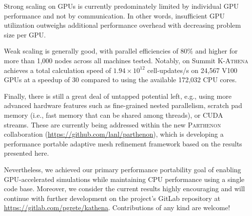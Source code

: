 \documentclass[10pt,journal,compsoc]{IEEEtran}
\newcommand{\textcode}[1]{\textsc{#1}}
\newcommand{\parthenon}{\textcode{Parthenon}\xspace}
\newcommand{\kathena}{\textcode{K-Athena}\xspace}
\newcommand{\cuda}{\textcode{CUDA}\xspace}
\begin{document}
Strong scaling on GPUs is currently predominately limited by individual GPU
performance and not by communication.
In other words, insufficient GPU utilization outweighs additional performance
overhead with decreasing problem size per GPU.

Weak scaling is generally good, with parallel efficiencies of $80\%$ and higher 
for more than 1,000 nodes across all machines tested.
Notably, on Summit \kathena achieves a total calculation speed of $1.94\times10^{12}$ cell-updates/s
on 24,567 V100 GPUs at a speedup of 30 compared to using the available 172,032 CPU cores.

Finally, there is still a great deal of untapped potential left, e.g., using
more advanced hardware features such as fine-grained nested parallelism, scratch pad 
memory (i.e., fast memory that can be shared among threads), or \cuda streams.
These are currently being addressed within the new \parthenon collaboration
(\url{https://github.com/lanl/parthenon}), which is developing a performance portable
adaptive mesh refinement framework based on the results presented here.

Nevertheless, we achieved our primary performance portability  goal of 
enabling GPU-accelerated simulations while maintaining CPU performance using a single 
code base.
Moreover, we consider the current results highly encouraging and will continue with
further development on the project's GitLab repository at 
\url{https://gitlab.com/pgrete/kathena}.
Contributions of any kind are welcome!


%
%
\end{document}
